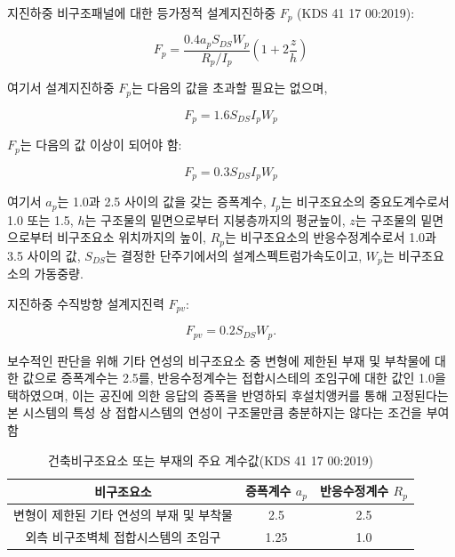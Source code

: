 \documentclass[9pt]{beamer}
\begin{document}
	\begin{frame}{지진하중}
	비구조패널에 대한 등가정적 설계지진하중 $F_p$ (KDS 41 17 00:2019):

\begin{equation*}
	F_p = \frac{0.4a_pS_{DS}W_p}{R_p/I_p}\left(1+2\frac{z}{h}\right)
\end{equation*}

\noindent 여기서 설계지진하중 $F_p$는 다음의 값을 초과할 필요는 없으며, 

\begin{equation}
	F_p = 1.6S_{DS}I_pW_p
\end{equation}

\noindent $F_p$는 다음의 값 이상이 되어야 함: 

\begin{equation*}
	F_p = 0.3S_{DS}I_pW_p
\end{equation*}

\noindent 여기서 $a_p$는 1.0과 2.5 사이의 값을 갖는 증폭계수, $I_p$는 비구조요소의 중요도계수로서 1.0 또는 1.5, $h$는 구조물의 밑면으로부터 지붕층까지의 평균높이, $z$는 구조물의 밑면으로부터 비구조요소 위치까지의 높이, $R_p$는 비구조요소의 반응수정계수로서 1.0과 3.5 사이의 값, $S_{DS}$는 결정한 단주기에서의 설계스펙트럼가속도이고, $W_p$는 비구조요소의 가동중량.
	\end{frame}
	\begin{frame}{지진하중}
	수직방향 설계지진력 $F_{pv}$:

\begin{equation}
	F_{pv} = 0.2S_{DS}W_p.
\end{equation}

보수적인 판단을 위해 기타 연성의 비구조요소 중 변형에 제한된 부재 및 부착물에 대한 값으로 증폭계수는 2.5를, 반응수정계수는 접합시스테의 조임구에 대한 값인 1.0을 택하였으며, 이는 공진에 의한 응답의 증폭을 반영하되 후설치앵커를 통해 고정된다는 본 시스템의 특성 상 접합시스템의 연성이 구조물만큼 충분하지는 않다는 조건을 부여함

\begin{table}[]
\centering
\caption{건축비구조요소 또는 부재의 주요 계수값(KDS 41 17 00:2019)}
\label{tab:001}
\begin{tabular}{@{}ccc@{}}
\toprule
비구조요소        & 증폭계수 $a_p$    & 반응수정계수 $R_p$  \\ \midrule
변형이 제한된 기타 연성의 부재 및 부착물       & 2.5    & 2.5 \\
외측 비구조벽체 접합시스템의 조임구 & 1.25    & 1.0  \\ \bottomrule
\end{tabular}
\end{table}
	\end{frame}
\end{document}
